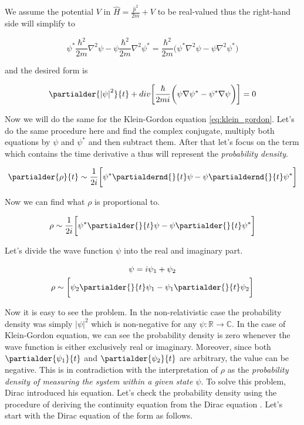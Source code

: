 We assume the potential $V$ in $\hat{H} = \frac{\hat{p}^{2}}{2m} + V$ to be real-valued thus the right-hand side
will simplify to

\begin{equation*}
    \psi^{*} \frac{\hbar^{2}}{2m} \nabla^{2} \psi - \psi \frac{\hbar^{2}}{2m} \nabla^{2} \psi^{*} 
    = \frac{\hbar^{2}}{2m} \bigg( \psi^{*} \nabla^{2} \psi - \psi \nabla^{2} \psi^{*} \bigg)
\end{equation*}

and the desired form is

\begin{equation*}
    \partialder{\left|\psi\right|^{2}}{t} + div \bigg[ \frac{\hbar}{2mi} \bigg( \psi \nabla \psi^{*} - \psi^{*} \nabla \psi \bigg) \bigg] = 0
\end{equation*}

Now we will do the same for the Klein-Gordon equation \ref{eq:klein_gordon}. Let's do the same procedure here and
find the complex conjugate, multiply both equations by $\psi$ and $\psi^{*}$ and then subtract them. After that 
let's focus on the term which contains the time derivative a thus will represent the \textit{probability density}.

\begin{equation*}
    \partialder{\rho}{t} \sim \frac{1}{2i} \bigg[ \psi^{*} \partialdernd{}{t} \psi - \psi \partialdernd{}{t} \psi^{*} \bigg]
\end{equation*}

Now we can find what $\rho$ is proportional to. 

\begin{equation}
    \rho \sim \frac{1}{2i} \bigg[ \psi^{*} \partialder{}{t} \psi - \psi \partialder{}{t} \psi^{*} \bigg]
\end{equation}

Let's divide the wave function $\psi$ into the real and imaginary part.

\begin{equation*}
    \begin{gathered}
        \psi = i \psi_{1} + \psi_{2} \\
        \rho \sim \bigg[ \psi_{2} \partialder{}{t} \psi_{1} - \psi_{1} \partialder{}{t} \psi_{2} \bigg]
    \end{gathered}
\end{equation*}

Now it is easy to see the problem. In the non-relativistic case the probability density was simply $|\psi|^{2}$ which is
non-negative for any $\psi: \mathbb{R} \to \mathbb{C}$. In the case of Klein-Gordon equation, we can see the probability 
density is zero whenever the wave function is either exclusively real or imaginary. Moreover, since both 
$\partialder{\psi_{1}}{t}$ and $\partialder{\psi_{2}}{t}$ are arbitrary, the value can be negative. This is in contradiction
with the interpretation of $\rho$ as the \textit{probability density of measuring the system within a given state $\psi$}.
To solve this problem, Dirac introduced his equation. Let's check the probability density using the procedure of deriving
the continuity equation from the Dirac equation \cite{dirac_equation_history}. Let's start with the Dirac equation of the 
form as follows.

